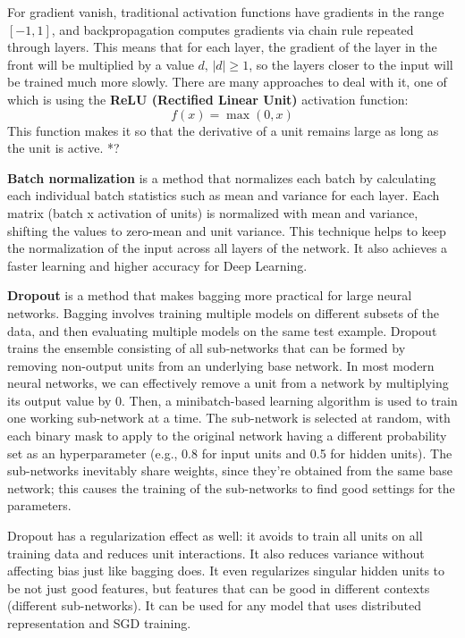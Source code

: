 For gradient vanish, traditional activation functions have gradients in the range $[-1,1]$, and backpropagation computes gradients via chain rule repeated through layers. This means that for each layer, the gradient of the layer in the front will be multiplied by a value $d,\,|d| \geq 1$, so the layers closer to the input will be trained much more slowly. There are many approaches to deal with it, one of which is using the \textbf{ReLU (Rectified Linear Unit)} activation function:
\begin{equation*}
    f(x) = \max(0,x)
\end{equation*}
This function makes it so that the derivative of a unit remains large as long as the unit is active. *?

\textbf{Batch normalization} is a method that normalizes each batch by calculating each individual batch statistics such as mean and variance for each layer. Each matrix (batch x activation of units) is normalized with mean and variance, shifting the values to zero-mean and unit variance. This technique helps to keep the normalization of the input across all layers of the network. It also achieves a faster learning and higher accuracy for Deep Learning.

\textbf{Dropout} is a method that makes bagging more practical for large neural networks. Bagging involves training multiple models on different subsets of the data, and then evaluating multiple models on the same test example. Dropout trains the ensemble consisting of all sub-networks that can be formed by removing non-output units from an underlying base network. In most modern neural networks, we can effectively remove a unit from a network by multiplying its output value by 0. Then, a minibatch-based learning algorithm is used to train one working sub-network at a time. The sub-network is selected at random, with each binary mask to apply to the original network having a different probability set as an hyperparameter (e.g., 0.8 for input units and 0.5 for hidden units). The sub-networks inevitably share weights, since they're obtained from the same base network; this causes the training of the sub-networks to find good settings for the parameters.

Dropout has a regularization effect as well: it avoids to train all units on all training data and reduces unit interactions. It also reduces variance without affecting bias just like bagging does. It even regularizes singular hidden units to be not just good features, but features that can be good in different contexts (different sub-networks). It can be used for any model that uses distributed representation and SGD training.
